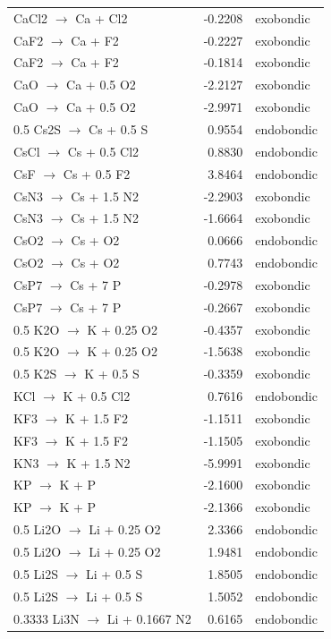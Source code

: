\begin{longtable}{@{}lrl@{}}
CaCl2 $\rightarrow$ Ca + Cl2 & -0.2208 & exobondic \\
CaF2 $\rightarrow$ Ca + F2 & -0.2227 & exobondic \\
CaF2 $\rightarrow$ Ca + F2 & -0.1814 & exobondic \\
CaO $\rightarrow$ Ca + 0.5 O2 & -2.2127 & exobondic \\
CaO $\rightarrow$ Ca + 0.5 O2 & -2.9971 & exobondic \\
0.5 Cs2S $\rightarrow$ Cs + 0.5 S & 0.9554 & endobondic \\
CsCl $\rightarrow$ Cs + 0.5 Cl2 & 0.8830 & endobondic \\
CsF $\rightarrow$ Cs + 0.5 F2 & 3.8464 & endobondic \\
CsN3 $\rightarrow$ Cs + 1.5 N2 & -2.2903 & exobondic \\
CsN3 $\rightarrow$ Cs + 1.5 N2 & -1.6664 & exobondic \\
CsO2 $\rightarrow$ Cs + O2 & 0.0666 & endobondic \\
CsO2 $\rightarrow$ Cs + O2 & 0.7743 & endobondic \\
CsP7 $\rightarrow$ Cs + 7 P & -0.2978 & exobondic \\
CsP7 $\rightarrow$ Cs + 7 P & -0.2667 & exobondic \\
0.5 K2O $\rightarrow$ K + 0.25 O2 & -0.4357 & exobondic \\
0.5 K2O $\rightarrow$ K + 0.25 O2 & -1.5638 & exobondic \\
0.5 K2S $\rightarrow$ K + 0.5 S & -0.3359 & exobondic \\
KCl $\rightarrow$ K + 0.5 Cl2 & 0.7616 & endobondic \\
KF3 $\rightarrow$ K + 1.5 F2 & -1.1511 & exobondic \\
KF3 $\rightarrow$ K + 1.5 F2 & -1.1505 & exobondic \\
KN3 $\rightarrow$ K + 1.5 N2 & -5.9991 & exobondic \\
KP $\rightarrow$ K + P & -2.1600 & exobondic \\
KP $\rightarrow$ K + P & -2.1366 & exobondic \\
0.5 Li2O $\rightarrow$ Li + 0.25 O2 & 2.3366 & endobondic \\
0.5 Li2O $\rightarrow$ Li + 0.25 O2 & 1.9481 & endobondic \\
0.5 Li2S $\rightarrow$ Li + 0.5 S & 1.8505 & endobondic \\
0.5 Li2S $\rightarrow$ Li + 0.5 S & 1.5052 & endobondic \\
0.3333 Li3N $\rightarrow$ Li + 0.1667 N2 & 0.6165 & endobondic \\

\end{longtable}
